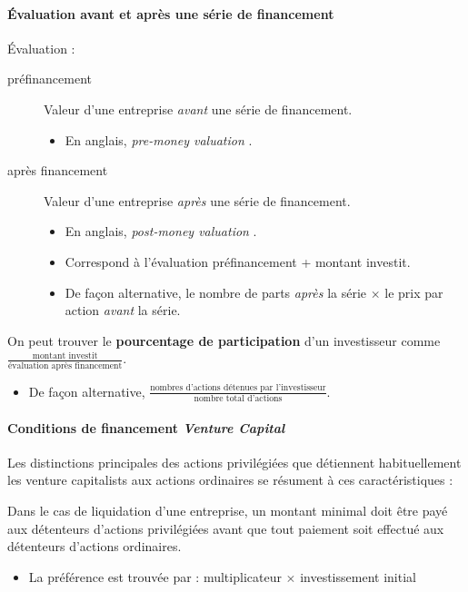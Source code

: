 \documentclass[10pt, french]{article}
\begin{document}
\begin{multicols*}{2}
\paragraph{Évaluation avant et après une série de financement}
Évaluation : 
\begin{description}
	\item[préfinancement]	Valeur d'une entreprise \textit{avant} une série de financement.
		\begin{itemize}
		\item	En anglais, \og \textit{pre-money valuation} \fg{}.
		\end{itemize}
	\item[après financement]	Valeur d'une entreprise \textit{après} une série de financement.
		\begin{itemize}
		\item	En anglais, \og \textit{post-money valuation} \fg{}.
		\item	Correspond à l'évaluation préfinancement + montant investit.
		\item	De façon alternative, le nombre de parts \textit{après} la série $\times$ le prix par action \textit{avant} la série.
		\end{itemize}
\end{description}

On peut trouver le \textbf{pourcentage de participation} d'un investisseur comme $\frac{\text{montant investit}}{\text{évaluation après financement}}$.
\begin{itemize}
	\item	De façon alternative, $\frac{\text{nombres d'actions détenues par l'investisseur}}{\text{nombre total d'actions}}$.
\end{itemize}


\paragraph{Conditions de financement \og \textit{Venture Capital} \fg{}}
Les distinctions principales des actions privilégiées que détiennent habituellement les \og venture capitalists \fg{} aux actions ordinaires se résument à ces caractéristiques :

\begin{definitionNOHFILLpropos}
Dans le cas de liquidation d'une entreprise, un montant minimal doit être payé aux détenteurs d'actions privilégiées avant que tout paiement soit effectué aux détenteurs d'actions ordinaires.
\begin{itemize}
	\item	La préférence est trouvée par : multiplicateur $\times$ investissement initial
\end{itemize}
\end{definitionNOHFILLpropos}


\end{multicols*}
\end{document}
